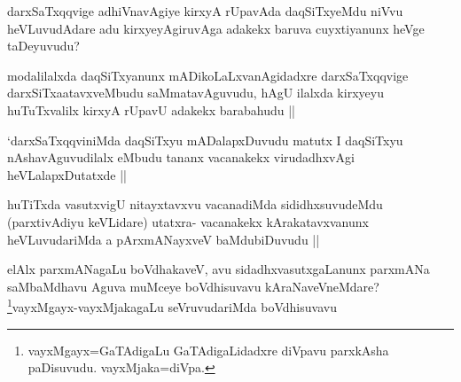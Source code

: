 
\begin{artha}
darxSaTxqqvige adhiVnavAgiye kirxyA rUpavAda daqSiTxyeMdu niVvu heVLuvudAdare adu kirxyeyAgiruvAga adakekx baruva cuyxtiyanunx heVge taDeyuvudu?
\end{artha}

\begin{artha}
modalilalxda daqSiTxyanunx mADikoLaLxvanAgidadxre darxSaTxqqvige darxSiTxaatavxveMbudu saMmatavAguvudu, hAgU ilalxda kirxyeyu huTuTxvalilx kirxyA rUpavU adakekx barabahudu ||
\end{artha}


\begin{artha}
`darxSaTxqqviniMda daqSiTxyu mADalapxDuvudu matutx I daqSiTxyu nAshavAguvudilalx eMbudu tananx vacanakekx virudadhxvAgi heVLalapxDutatxde ||
\end{artha}


\begin{artha}
huTiTxda vasutxvigU nitayxtavxvu vacanadiMda sididhxsuvudeMdu (parxtivAdiyu keVLidare) utatxra- vacanakekx kArakatavxvanunx heVLuvudariMda a pArxmANayxveV baMdubiDuvudu ||
\end{artha}

\begin{artha}
elAlx parxmANagaLu boVdhakaveV, avu sidadhxvasutxgaLanunx parxmANa saMbaMdhavu Aguva muMceye boVdhisuvavu kAraNaveVneMdare? \footnote{vayxMgayx=GaTAdigaLu GaTAdigaLidadxre diVpavu parxkAsha paDisuvudu. vayxMjaka=diVpa.}vayxMgayx-vayxMjakagaLu seVruvudariMda boVdhisuvavu
\end{artha} 
